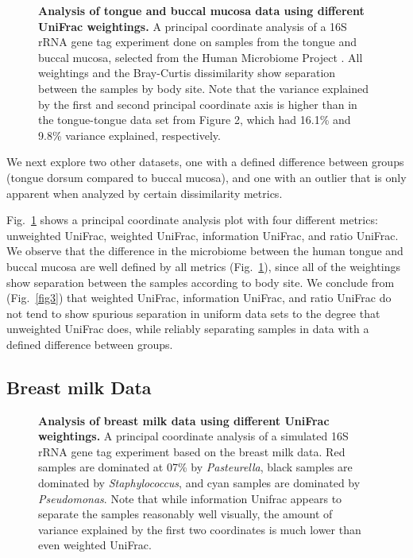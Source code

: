 \documentclass[10pt,letterpaper]{article}
\begin{document}
\begin{figure}[h]
\caption[Analysis of tongue and buccal mucosa data using different UniFrac weightings.]{{\bf Analysis of tongue and buccal mucosa data using different UniFrac weightings. }
A principal coordinate analysis of a 16S rRNA gene tag experiment done on samples from the tongue and buccal mucosa, selected from the Human Microbiome Project \cite{turnbaugh2007human}. All weightings and the Bray-Curtis dissimilarity show separation between the samples by body site. Note that the variance explained by the first and second principal coordinate axis is higher than in the tongue-tongue data set from Figure 2, which had 16.1\% and 9.8\% variance explained, respectively.}
\label{fig6}
\end{figure}

We next explore two other datasets, one with a defined difference between groups (tongue dorsum compared to buccal mucosa), and one with an outlier that is only apparent when analyzed by certain dissimilarity metrics.

Fig.~\ref{fig6} shows a principal coordinate analysis plot with four different metrics: unweighted UniFrac, weighted UniFrac, information UniFrac, and ratio UniFrac. We observe that the difference in the microbiome between the human tongue and buccal mucosa are well defined by all metrics (Fig.~\ref{fig6}), since all of the weightings show separation between the samples according to body site. We conclude from (Fig.~\ref{fig3}) that weighted UniFrac, information UniFrac, and ratio UniFrac do not tend to show spurious separation in uniform data sets to the degree that unweighted UniFrac does, while reliably separating samples in data with a defined difference between groups.

\FloatBarrier

\subsection{Breast milk Data}

\begin{figure}[h]
\caption[Analysis of breast milk data using different UniFrac weightings.]{{\bf Analysis of breast milk data using different UniFrac weightings. }
A principal coordinate analysis of a simulated 16S rRNA gene tag experiment based on the breast milk data. Red samples are dominated at 07\% by \textit{Pasteurella}, black samples are dominated by \textit{Staphylococcus}, and cyan samples are dominated by \textit{Pseudomonas}. Note that while information Unifrac appears to separate the samples reasonably well visually, the amount of variance explained by the first two coordinates is much lower than even weighted UniFrac.}
\label{fig7}
\end{figure}
\end{document}
